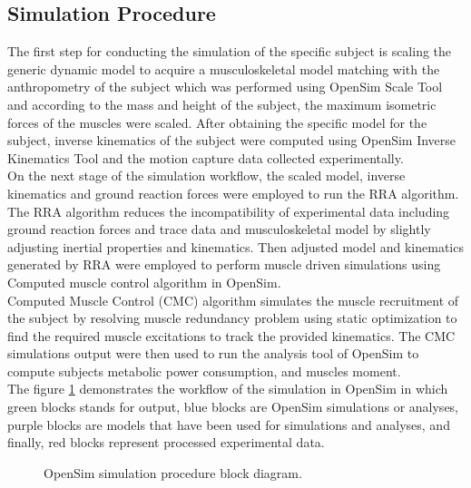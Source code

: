 \documentclass[10pt,letterpaper]{article}
\begin{document}
\subsection*{Simulation Procedure}
The first step for conducting the simulation of the specific subject is scaling the generic dynamic model to acquire a musculoskeletal model matching with the anthropometry of the subject which was performed using OpenSim Scale Tool and according to the mass and height of the subject, the maximum isometric forces of the muscles were scaled. After obtaining the specific model for the subject, inverse kinematics of the subject were computed using OpenSim Inverse Kinematics Tool and the motion capture data collected experimentally.\\
On the next stage of the simulation workflow, the scaled model, inverse kinematics and ground reaction forces were employed to run the RRA algorithm\cite{103}. The RRA algorithm reduces the incompatibility of experimental data including ground reaction forces and trace data and musculoskeletal model by slightly adjusting inertial properties and kinematics. Then adjusted model and kinematics generated by RRA were employed to perform muscle driven simulations using Computed muscle control algorithm in OpenSim\cite{104}.\\
Computed Muscle Control (CMC) algorithm simulates the muscle recruitment of the subject by resolving muscle redundancy problem using static optimization to find the required muscle excitations to track the provided kinematics. The CMC simulations output were then used to run the analysis tool of OpenSim to compute subjects metabolic power consumption, and muscles moment.\\
The figure \ref{Fig_OpenSim_Sim_Procedure} demonstrates the workflow of the simulation in OpenSim in which green blocks stands for output, blue blocks are OpenSim simulations or analyses, purple blocks are models that have been used for simulations and analyses, and finally, red blocks represent processed experimental data.\\
\begin{figure}[ht]
	\caption{OpenSim simulation procedure block diagram.}
	\label{Fig_OpenSim_Sim_Procedure}
\end{figure}
\end{document}

